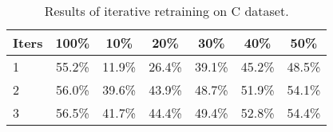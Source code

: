 \begin{table}[t]
\caption{Results of iterative retraining on C dataset.}
\label{tab:c-iterative-retraining}
\centering
\begin{tabular}{lc|ccccc}
\toprule
\textbf{Iters} & \textbf{100\%}  & \textbf{10\%} & \textbf{20\%} & \textbf{30\%} & \textbf{40\%} & \textbf{50\%}\\
\midrule
1 & 55.2\% & 11.9\% & 26.4\% & 39.1\% & 45.2\% & 48.5\% \\
2 & 56.0\% & 39.6\% & 43.9\% & 48.7\% & 51.9\% & 54.1\% \\
3 & 56.5\% & 41.7\% & 44.4\% & 49.4\% & 52.8\% & 54.4\% \\
\bottomrule
\end{tabular}
\end{table}